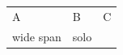 \begin{longtable}[]{@{}lll@{}}
A\par
 & B\par
 & C\par
\tabularnewline
wide span\par
 & solo\par
\tabularnewline
\hline
\end{longtable}
